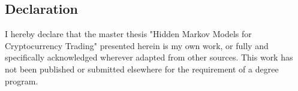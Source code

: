 
\begin{declaration}
    
\section*{Declaration}

I hereby declare that the master thesis "Hidden Markov Models for Cryptocurrency Trading" presented herein is my own work, 
or fully and specifically acknowledged wherever adapted from other sources. 
This work has not been published or submitted elsewhere for the requirement of a degree program. 

\end{declaration}